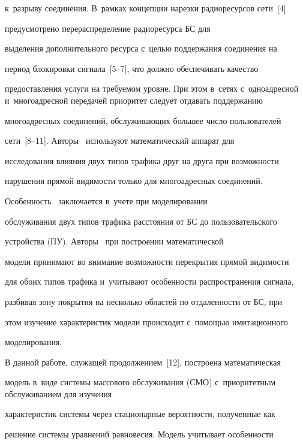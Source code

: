к~разрыву со\-еди\-не\-ния. В~рамках концепции нарезки радиоресурсов сети~[4] 

предусмот\-ре\-но перераспределение радиоресурса БС для 

выделения дополнительного ресурса с~целью поддержания соединения на 

период блокировки сигнала~[5--7], что долж\-но обеспечивать качество 

предоставления услуги на тре\-бу\-емом уровне. При этом в~сетях с~одноадресной и~многоадресной передачей приоритет следует отдавать поддержанию 

многоадресных соединений, об\-слу\-жи\-ва\-ющих большее чис\-ло пользователей 

сети~[8--11]. Авторы~\cite{8-gai-1} используют математический аппарат для 

исследования влияния двух типов трафика друг на друга при воз\-мож\-ности 

нарушения прямой ви\-ди\-мости только для многоадресных со\-еди\-не\-ний. 

Особенность~\cite{9-gai-1, 10-gai-1} заключается в~учете при моделировании 

обслуживания двух типов трафика расстояния от БС до пользовательского 

устройства (ПУ). Авторы~\cite{11-gai-1} при построении математической 

модели принимают во внимание возможности перекрытия прямой ви\-ди\-мо\-сти 

для обоих типов трафика и~учитывают особенности распространения сигнала, 

разбивая зону покрытия на несколько областей по отдаленности от БС, при 

этом изучение характеристик модели происходит с~по\-мощью имитационного 

моделирования.

{ %



}

  

  В данной работе, служащей продолжением~[12], построена математическая 

модель в~виде системы массового обслуживания (СМО) с~приоритетным обслуживанием для изуче\-ния 

характеристик сис\-те\-мы через стационарные вероятности, полученные как 

решение сис\-те\-мы уравнений равновесия. Модель учитывает особенности 

